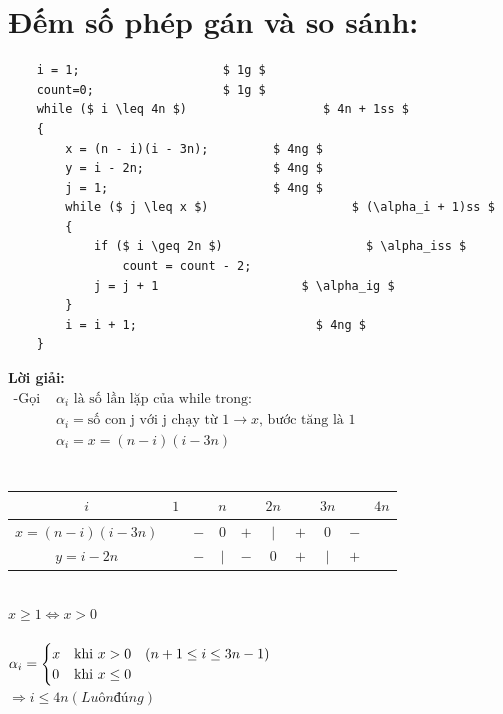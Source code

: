 \documentclass[12pt, letterpaper]{article}
\begin{document}
{{{\section{Đếm số phép gán và so sánh:}
\begin{lstlisting}
	i = 1;					  $ 1g $
	count=0;                  $ 1g $
	while ($ i \leq 4n $)           		$ 4n + 1ss $
	{
		x = (n - i)(i - 3n);         $ 4ng $
		y = i - 2n;                  $ 4ng $
		j = 1;                       $ 4ng $
		while ($ j \leq x $)                    $ (\alpha_i + 1)ss $
		{
			if ($ i \geq 2n $)                    $ \alpha_iss $
				count = count - 2;
			j = j + 1                    $ \alpha_ig $
		}
		i = i + 1;                         $ 4ng $
	}
	\end{lstlisting}
	\textbf{Lời giải:} \\
	$ \begin{aligned}
		\text{-Gọi } & \alpha_i \text{ là số lần lặp của while trong:}                              \\
					& \alpha_i = \text{số con j với j chạy từ 1} \rightarrow x \text{, bước tăng là 1} \\
					& \alpha_i = x = (n-i)(i-3n) \\
	\end{aligned} $ \\
	 \\
	\begin{table}[htb]
		\begin{tabular}{c|c c c c c c c c c}
			$i$ & $1$ &  & $n$ &  & $2n$ &  & $3n$  & & $4n$\\
			\hline
			$x = (n-i)(i-3n)$ &  & $-$ & $0$ & $+$ & $\vert$ & $+$ & $0$ & $-$\\
			\hline
			$y = i - 2n$ &  & $-$ & $\vert$ & $-$ & $0$ & $+$ & $\vert$ & $+$\\
		\end{tabular}
	\end{table} \\
	 $x \geq 1 \Leftrightarrow x > 0$ \\ \\
	$\alpha_i =
	\begin{cases}
	x &\text{khi } x>0 \quad (n + 1 \leq i \leq 3n - 1)\\
	0 &\text{khi } x\leq 0
	\end{cases} \\$
	 \\
	$\Rightarrow i \leq 4n (Luôn đúng)$\\
}}}
\end{document}
